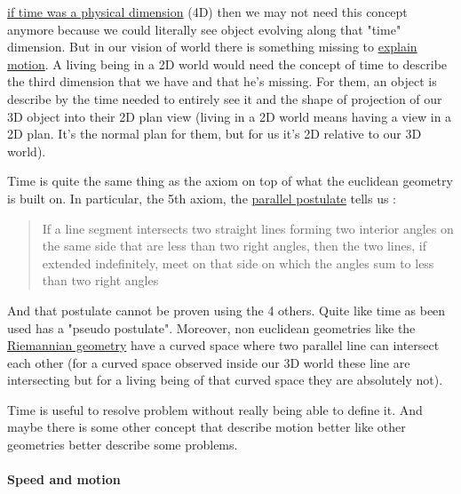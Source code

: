 \documentclass[12pt]{article}
\begin{document}
\href{https://www.youtube.com/watch?v=EedRLTlOp20&ab_channel=Scilabus}{if time was a physical dimension} (4D) then we may not need this concept anymore because we could literally see object evolving along that "time" dimension. But in our vision of world there is something missing to \href{https://www.youtube.com/watch?v=NDYIdBMLQR0&ab_channel=argerichrichter1234}{explain motion}.
A living being in a 2D world would need the concept of time to describe the third dimension that we have and that he's missing. For them, an object is describe by the time needed to entirely see it and the shape of projection of our 3D object into their 2D plan view (living in a 2D world means having a view in a 2D plan. It's the normal plan for them, but for us it's 2D relative to our 3D world).

\begin{figure}[H]
 \centering
 
\end{figure}

Time is quite the same thing as the axiom on top of what the euclidean geometry is built on. In particular, the 5th axiom, the \href{https://en.wikipedia.org/wiki/Parallelpostulate}{parallel postulate} tells us :

\begin{quote}
If a line segment intersects two straight lines forming two interior angles on the same side that are less than two right angles, then the two lines, if extended indefinitely, meet on that side on which the angles sum to less than two right angles
\end{quote}

And that postulate cannot be proven using the 4 others. Quite like time as been used has a "pseudo postulate". Moreover, non euclidean geometries like the \href{https://en.wikipedia.org/wiki/Riemannian_geometry}{Riemannian geometry} have a curved space where two parallel line can intersect each other (for a curved space observed inside our 3D world these line are intersecting but for a living being of that curved space they are absolutely not).

Time is useful to resolve problem without really being able to define it. And maybe there is some other concept that describe motion better like other geometries better describe some problems.

\paragraph{Speed and motion}
\end{document}
